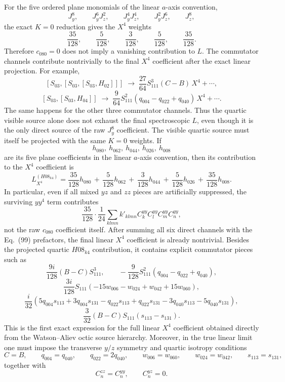 \documentclass[aip,jcp,reprint,floatfix]{revtex4-2}
\begin{document}
For the five ordered plane monomials of the linear \(a\)-axis convention,
\[
J_y^8,\qquad J_y^6J_z^2,\qquad J_y^4J_z^4,\qquad J_y^2J_z^6,\qquad J_z^8,
\]
the exact \(K=0\) reduction gives the \(X^4\) weights
\[
\frac{35}{128},\qquad \frac{5}{128},\qquad \frac{3}{128},\qquad \frac{5}{128},\qquad \frac{35}{128}.
\]
Therefore \(c_{080}=0\) does not imply a vanishing contribution to \(L\). The
commutator channels contribute nontrivially to the final \(X^4\) coefficient
after the exact linear projection. For example,
\[
[S_{03},[S_{03},[S_{03},H_{02}]]]
\;\longrightarrow\;
\frac{27}{64}S_{111}^3(C-B)\,X^4+\cdots,
\]
\[
[S_{03},[S_{03},H_{04}]]
\;\longrightarrow\;
\frac{9}{64}S_{111}^2(q_{004}-q_{022}+q_{040})\,X^4+\cdots.
\]
The same happens for the other three commutator channels. Thus the quartic
visible source alone does not exhaust the final spectroscopic \(L\), even
though it is the only direct source of the raw \(J_y^8\) coefficient.
The visible quartic source must itself be projected with the same \(K=0\)
weights. If
\[
h_{080},\ h_{062},\ h_{044},\ h_{026},\ h_{008}
\]
are its five plane coefficients in the linear \(a\)-axis convention, then its
contribution to the \(X^4\) coefficient is
\[
L^{(H08_{k4})}_{X^4}
=
\frac{35}{128}h_{080}
\,+\,
\frac{5}{128}h_{062}
\,+\,
\frac{3}{128}h_{044}
\,+\,
\frac{5}{128}h_{026}
\,+\,
\frac{35}{128}h_{008}.
\]
In particular, even if all mixed \(yz\) and \(zz\) pieces are artificially
suppressed, the surviving \(yy^4\) term contributes
\[
\frac{35}{128}\cdot \frac{1}{24}\sum_{klmn}k'_{klmn}
C_k^{yy}C_l^{yy}C_m^{yy}C_n^{yy},
\]
not the raw \(c_{080}\) coefficient itself.
After summing all six direct channels with the Eq.~(99) prefactors, the final
linear \(X^4\) coefficient is already nontrivial. Besides the projected
quartic \(H08_{k4}\) contribution, it contains explicit commutator pieces such
as
\[
\frac{9i}{128}(B-C)S_{111}^3,
\qquad
-\frac{9}{128}S_{111}^2(q_{004}-q_{022}+q_{040}),
\]
\[
\frac{3i}{128}S_{111}(-15w_{006}-w_{024}+w_{042}+15w_{060}),
\]
\[
\frac{i}{32}(5q_{004}s_{113}+3q_{004}s_{131}-q_{022}s_{113}+q_{022}s_{131}-3q_{040}s_{113}-5q_{040}s_{131}),
\]
\[
\frac{3}{32}(B-C)S_{111}(s_{113}-s_{131}).
\]
This is the first exact expression for the full linear \(X^4\) coefficient
obtained directly from the Watson--Aliev octic source hierarchy.
Moreover, in the true linear limit one must impose the transverse \(y/z\)
symmetry and quartic isotropy conditions
\[
C=B,\qquad q_{004}=q_{040},\qquad q_{022}=2q_{040},\qquad
w_{006}=w_{060},\qquad w_{024}=w_{042},\qquad s_{113}=s_{131},
\]
together with
\[
C_n^{zz}=C_n^{yy},\qquad C_n^{yz}=0.
\]
\end{document}
